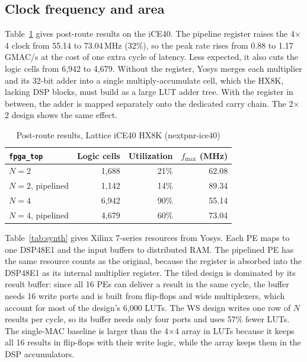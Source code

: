 \documentclass[conference]{IEEEtran}
\newcommand{\code}[1]{\texttt{#1}}
\begin{document}
\subsection{Clock frequency and area}
\label{sec:area}
Table~\ref{tab:fmax} gives post-route results on the iCE40. The pipeline register raises the 4$\times$4 clock from 55.14 to 73.04\,MHz (32\%), so the peak rate rises from 0.88 to 1.17\,GMAC/s at the cost of one extra cycle of latency. Less expected, it also cuts the logic cells from 6,942 to 4,679. Without the register, Yosys merges each multiplier and its 32-bit adder into a single multiply-accumulate cell, which the HX8K, lacking DSP blocks, must build as a large LUT adder tree. With the register in between, the adder is mapped separately onto the dedicated carry chain. The 2$\times$2 design shows the same effect.

\begin{table}[t]
\centering
\caption{Post-route results, Lattice iCE40 HX8K (nextpnr-ice40)}
\label{tab:fmax}
\begin{tabular}{lrrr}
\toprule
\code{fpga\_top} & Logic cells & Utilization & $f_{\max}$ (MHz) \\
\midrule
$N{=}2$ & 1,688 & 21\% & 62.08 \\
$N{=}2$, pipelined & 1,142 & 14\% & 89.34 \\
$N{=}4$ & 6,942 & 90\% & 55.14 \\
$N{=}4$, pipelined & 4,679 & 60\% & 73.04 \\
\bottomrule
\end{tabular}
\end{table}

Table~\ref{tab:synth} gives Xilinx 7-series resources from Yosys. Each PE maps to one DSP48E1 and the input buffers to distributed RAM. The pipelined PE has the same resource counts as the original, because the register is absorbed into the DSP48E1 as its internal multiplier register. The tiled design is dominated by its result buffer: since all 16 PEs can deliver a result in the same cycle, the buffer needs 16 write ports and is built from flip-flops and wide multiplexers, which account for most of the design's 6,000 LUTs. The WS design writes one row of $N$ results per cycle, so its buffer needs only four ports and uses 57\% fewer LUTs. The single-MAC baseline is larger than the 4$\times$4 array in LUTs because it keeps all 16 results in flip-flops with their write logic, while the array keeps them in the DSP accumulators.
\end{document}
